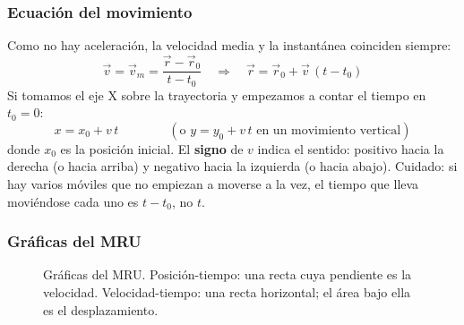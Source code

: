 \subsubsection{Ecuación del movimiento}

Como no hay aceleración, la velocidad media y la instantánea coinciden siempre:
\[ \vec v = \vec v_m = \frac{\vec r - \vec r_0}{t - t_0} \quad\Rightarrow\quad \vec r = \vec r_0 + \vec v\,(t - t_0) \]
Si tomamos el eje X sobre la trayectoria y empezamos a contar el tiempo en \(t_0 = 0\):
\[ \boxed{x = x_0 + v\,t} \qquad\qquad (\text{o } y = y_0 + v\,t \text{ en un movimiento vertical}) \]
donde \(x_0\) es la posición inicial. El \textbf{signo} de \(v\) indica el sentido: positivo hacia la derecha (o hacia arriba) y
negativo hacia la izquierda (o hacia abajo). Cuidado: si hay varios móviles que no empiezan a moverse a la vez, el tiempo que lleva
moviéndose cada uno es \(t - t_0\), no \(t\).

\subsubsection{Gráficas del MRU}

\begin{figure}[H]
    \centering
    \hspace{1cm}
    \caption{Gráficas del MRU. Posición-tiempo: una recta cuya pendiente es la velocidad. Velocidad-tiempo: una recta horizontal;
    el área bajo ella es el desplazamiento.}
    \label{fig:ud9-graficas-mru}
\end{figure}

